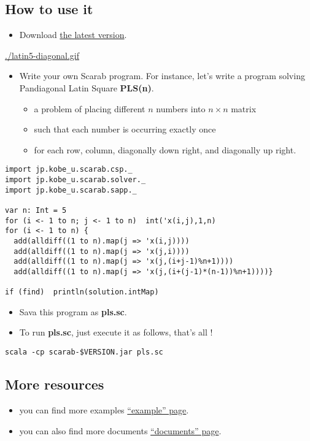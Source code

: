 \documentclass[11pt]{article}
\begin{document}
\subsection*{How to use it}
\label{sec-1-1}
\begin{itemize}
\item Download \href{http://kix.istc.kobe-u.ac.jp/~soh/scarab/scarab-v1-6-9.zip}{the latest version}.
\end{itemize}
\url{./latin5-diagonal.gif}
\begin{itemize}
\item Write your own Scarab program. For instance, let's write a program solving Pandiagonal Latin Square \textbf{PLS(n)}.  
\begin{itemize}
\item a problem of placing different $n$ numbers into $n \times n$ matrix
\item such that each number is occurring exactly once
\item for each row, column, diagonally down right, and diagonally up right.
\end{itemize}
\end{itemize}
\begin{verbatim}
import jp.kobe_u.scarab.csp._
import jp.kobe_u.scarab.solver._
import jp.kobe_u.scarab.sapp._

var n: Int = 5
for (i <- 1 to n; j <- 1 to n)  int('x(i,j),1,n) 
for (i <- 1 to n) {
  add(alldiff((1 to n).map(j => 'x(i,j))))
  add(alldiff((1 to n).map(j => 'x(j,i))))
  add(alldiff((1 to n).map(j => 'x(j,(i+j-1)%n+1))))
  add(alldiff((1 to n).map(j => 'x(j,(i+(j-1)*(n-1))%n+1))))}

if (find)  println(solution.intMap)
\end{verbatim}
\begin{itemize}
\item Sava this program as \textbf{pls.sc}.
\item To run \textbf{pls.sc}, just execute it as follows, that's all !
\end{itemize}
\begin{verbatim}
scala -cp scarab-$VERSION.jar pls.sc
\end{verbatim}

\subsection*{More resources}
\label{sec-1-2}
\begin{itemize}
\item you can find more examples \href{./examples.html}{``example'' page}.
\item you can also find more documents \href{./doc.html}{``documents'' page}.
\end{itemize}
\end{document}
